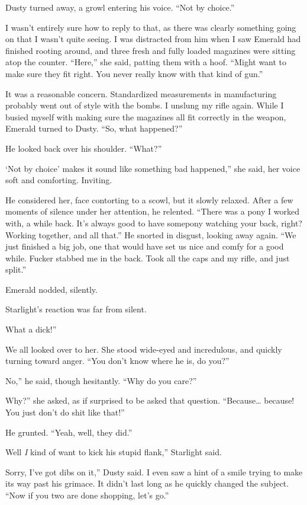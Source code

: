 Dusty turned away, a growl entering his voice. “Not by choice.”

I wasn’t entirely sure how to reply to that, as there was clearly something going on that I wasn’t quite seeing. I was distracted from him when I saw Emerald had finished rooting around, and three fresh and fully loaded magazines were sitting atop the counter. “Here,” she said, patting them with a hoof. “Might want to make sure they fit right. You never really know with that kind of gun.”

It was a reasonable concern. Standardized measurements in manufacturing probably went out of style with the bombs. I unslung my rifle again. While I busied myself with making sure the magazines all fit correctly in the weapon, Emerald turned to Dusty. “So, what happened?”

He looked back over his shoulder. “What?”

\leavevmode{}‘Not by choice’ makes it sound like something bad happened,” she said, her voice soft and comforting. Inviting.

He considered her, face contorting to a scowl, but it slowly relaxed. After a few moments of silence under her attention, he relented. “There was a pony I worked with, a while back. It’s always good to have somepony watching your back, right? Working together, and all that.” He snorted in disgust, looking away again. “We just finished a big job, one that would have set us nice and comfy for a good while. Fucker stabbed me in the back. Took all the caps and my rifle, and just split.”

Emerald nodded, silently.

Starlight’s reaction was far from silent.

\leavevmode{}What a dick!”

We all looked over to her. She stood wide-eyed and incredulous, and quickly turning toward anger. “You don’t know where he is, do you?”

\leavevmode{}No,” he said, though hesitantly. “Why do you care?”

\leavevmode{}Why?” she asked, as if surprised to be asked that question. “Because… because! You just don’t do shit like that!”

He grunted. “Yeah, well, they did.”

\leavevmode{}Well \textit{I} kind of want to kick his stupid flank,” Starlight said.

\leavevmode{}Sorry, I’ve got dibs on it,” Dusty said. I even saw a hint of a smile trying to make its way past his grimace. It didn’t last long as he quickly changed the subject. “Now if you two are done shopping, let’s go.”

